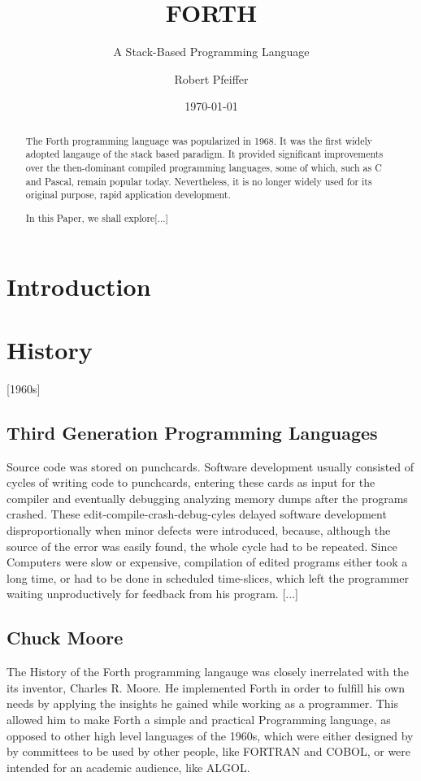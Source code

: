 \documentclass{llncs}
\title{FORTH}
\subtitle{A Stack-Based Programming Language}
\author{Robert Pfeiffer}
\date{\today}
\institute{History of Programming Languages, Software Architecture Group, Hasso-Plattner-Institut, Universität Potsdam, D-14482 Potsdam, Germany,\\
  \email{robert.pfeiffer@student.hpi.uni-potsdam.de}}
\begin{document}
\maketitle
\begin{abstract}
  The Forth programming language was popularized in 1968. It was the first widely adopted langauge of the stack based paradigm.
It provided significant improvements over the then-dominant compiled programming languages, some of which, such as C and Pascal, remain popular today.
Nevertheless, it is no longer widely used for its original purpose, rapid application development.

  In this Paper, we shall explore[...]
\end{abstract}
\section{Introduction}
\section{History}
[1960s]

\subsection{Third Generation Programming Languages}
Source code was stored on punchcards. Software development usually consisted of cycles of writing code to punchcards, entering these cards as input for the compiler and eventually debugging analyzing memory dumps after the programs crashed.
These edit-compile-crash-debug-cyles delayed software development disproportionally when minor defects were introduced, because, although the source of the error was easily found, the whole cycle had to be repeated.
Since Computers were slow or expensive, compilation of edited programs either took a long time, or had to be done in scheduled time-slices, which left the programmer waiting unproductively for feedback from his program.
[...]

\subsection{Chuck Moore}
The History of the Forth programming langauge was closely inerrelated with the its inventor, Charles R. Moore.
He implemented Forth in order to fulfill his own needs by applying the insights he gained while working as a programmer.
This allowed him to make Forth a simple and practical Programming language, as opposed to other high level languages of the 1960s, which were either designed by by committees to be used by other people, like FORTRAN and COBOL, or were intended for an academic audience, like ALGOL. 
\end{document}
